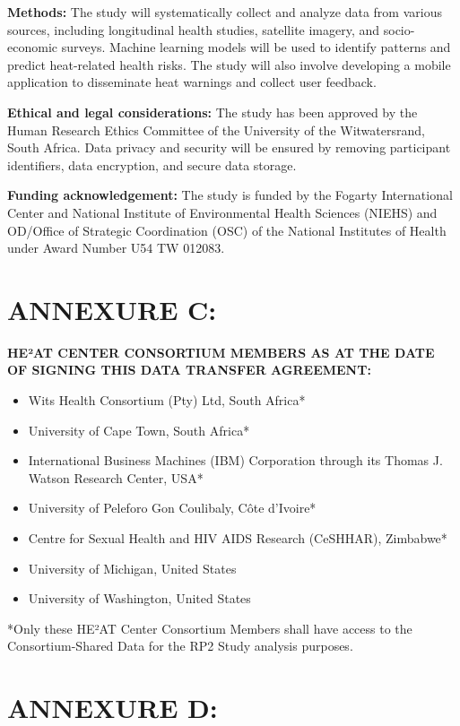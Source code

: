 \documentclass[12pt,letterpaper]{article}
\begin{document}
\textbf{Methods:} The study will systematically collect and analyze data from various sources, including longitudinal health studies, satellite imagery, and socio-economic surveys. Machine learning models will be used to identify patterns and predict heat-related health risks. The study will also involve developing a mobile application to disseminate heat warnings and collect user feedback.

\textbf{Ethical and legal considerations:} The study has been approved by the Human Research Ethics Committee of the University of the Witwatersrand, South Africa. Data privacy and security will be ensured by removing participant identifiers, data encryption, and secure data storage.

\textbf{Funding acknowledgement:} The study is funded by the Fogarty International Center and National Institute of Environmental Health Sciences (NIEHS) and OD/Office of Strategic Coordination (OSC) of the National Institutes of Health under Award Number U54 TW 012083.

\newpage

\section*{ANNEXURE C:}

\textbf{HE²AT CENTER CONSORTIUM MEMBERS AS AT THE DATE OF SIGNING THIS DATA TRANSFER AGREEMENT:}

\begin{itemize}
    \item Wits Health Consortium (Pty) Ltd, South Africa*
    \item University of Cape Town, South Africa*
    \item International Business Machines (IBM) Corporation through its Thomas J. Watson Research Center, USA*
    \item University of Peleforo Gon Coulibaly, Côte d'Ivoire*
    \item Centre for Sexual Health and HIV AIDS Research (CeSHHAR), Zimbabwe*
    \item University of Michigan, United States
    \item University of Washington, United States
\end{itemize}

*Only these HE²AT Center Consortium Members shall have access to the Consortium-Shared Data for the RP2 Study analysis purposes.

\newpage

\section*{ANNEXURE D:}
\end{document}
